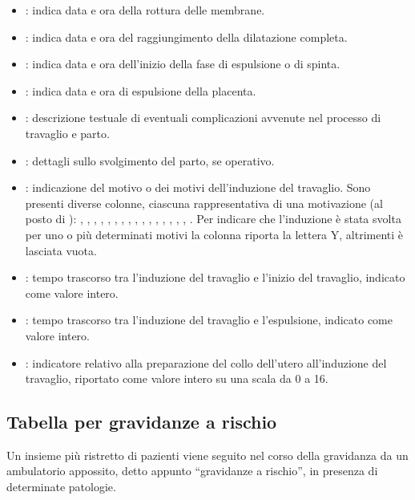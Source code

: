 \begin{itemize}
\item {}: indica data e ora della rottura delle membrane.
\item {}: indica data e ora del raggiungimento della dilatazione completa.
\item {}: indica data e ora dell'inizio della fase di espulsione o di spinta.
\item {}: indica data e ora di espulsione della placenta.
\item {}: descrizione testuale di eventuali complicazioni avvenute nel processo di travaglio e parto.
\item {}: dettagli sullo svolgimento del parto, se operativo.
\item {}: indicazione del motivo o dei motivi dell'induzione del travaglio. Sono presenti diverse colonne, ciascuna rappresentativa di una motivazione (al posto di ): , , , , , , , , , , , , , , , , . Per indicare che l'induzione è stata svolta per uno o più determinati motivi la colonna riporta la lettera Y, altrimenti è lasciata vuota.
\item {}: tempo trascorso tra l'induzione del travaglio e l'inizio del travaglio, indicato come valore intero.
\item {}: tempo trascorso tra l'induzione del travaglio e l'espulsione, indicato come valore intero.
\item {}: indicatore relativo alla preparazione del collo dell'utero all'induzione del travaglio, riportato come valore intero su una scala da 0 a 16.
\end{itemize}

\subsection{Tabella per gravidanze a rischio}
\label{pregnanciesatrisk}

Un insieme più ristretto di pazienti viene seguito nel corso della gravidanza da un ambulatorio appossito, detto appunto \enquote{gravidanze a rischio}, in presenza di determinate patologie.

